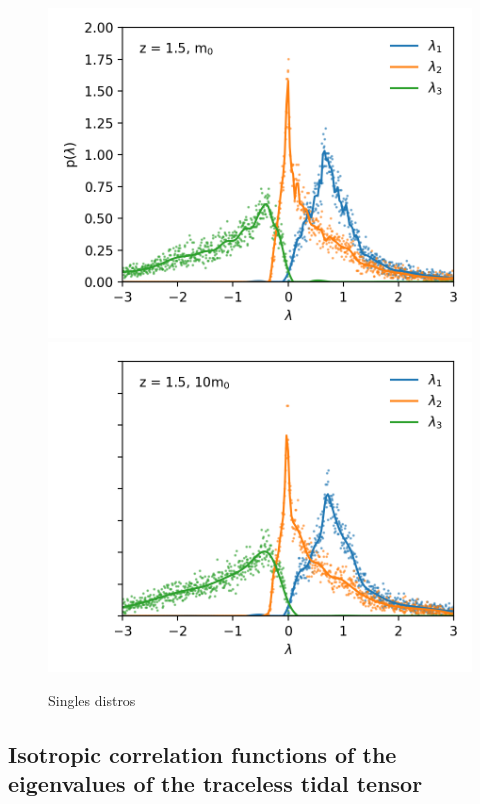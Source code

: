 \documentclass[a4paper,11pt]{article}
\begin{document}
\begin{figure}[!htb]
  \includegraphics[trim={1cm 0 0 1cm},scale=0.8]{distro_single_light_107.png}
\endminipage\hfill
{}%
  \includegraphics[trim={1cm 0 0 1cm},scale=0.8]{distro_single_mid_107.png}
\endminipage
\caption{Singles distros}\label{fig:singles_distros}
\end{figure}



\subsection{Isotropic correlation functions of the eigenvalues of the traceless tidal tensor}\label{sec:iso}
\end{document}
